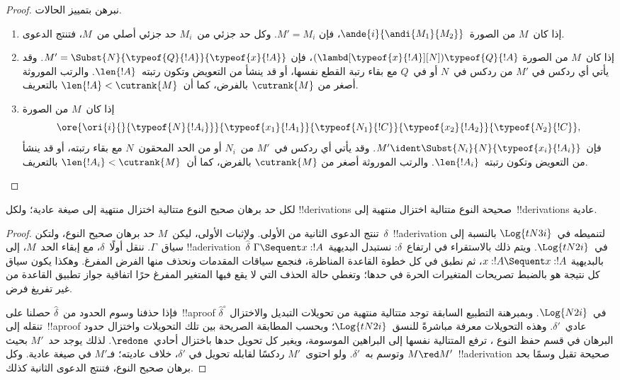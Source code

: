 \documentclass[../../../include/open-logic-section]{subfiles}
\begin{document}
\begin{proof}
  نبرهن بتمييز الحالات.
  \begin{enumerate}
  \item إذا كان~$M$ من الصورة~$\ande{i}{\andi{M_1}{M_2}}$، فإن
    $M'=M_i$. وكل حد جزئي من~$M_i$ حد جزئي أصلي من~$M$، فتنتج الدعوى.
  \item إذا كان~$M$ من الصورة
    $(\lambd[\typeof{x}{!A}][N])\typeof{Q}{!A}$، فإن
    $M'=\Subst{N}{\typeof{Q}{!A}}{\typeof{x}{!A}}$. وقد يأتي أي ردكس في
    $M'$ من ردكس في~$N$ أو في~$Q$ مع بقاء رتبة القطع نفسها، أو قد ينشأ من
    التعويض وتكون رتبته~$\len{!A}$. والرتب الموروثة أصغر من
    $\cutrank{M}$ بالفرض، كما أن~$\len{!A}<\cutrank{M}$ بالتعريف.
  \item إذا كان~$M$ من الصورة
    \[
    \ore{\ori{i}{}{\typeof{N}{!A_i}}}
        {\typeof{x_1}{!A_1}}{\typeof{N_1}{!C}}
        {\typeof{x_2}{!A_2}}{\typeof{N_2}{!C}},
    \]
    فإن~$M'\ident\Subst{N_i}{N}{\typeof{x_i}{!A_i}}$. وقد يأتي أي ردكس
    في~$M'$ من~$N_i$ أو من الحد المحقون~$N$ مع بقاء رتبته، أو قد ينشأ من
    التعويض وتكون رتبته~$\len{!A_i}$. والرتب الموروثة أصغر من
    $\cutrank{M}$ بالفرض، كما أن~$\len{!A_i}<\cutrank{M}$ بالتعريف.
  \end{enumerate}
\end{proof}

\begin{thm}
  لكل حد برهان صحيح النوع متتالية اختزال منتهية إلى صيغة عادية؛ ولكل
  !!{derivation}s صحيحة النوع متتالية اختزال منتهية إلى~!!{derivation}s
  عادية.
\end{thm}

\begin{proof}
  تنتج الدعوى الثانية من الأولى. ولإثبات الأولى، ليكن~$M$ حد برهان صحيح
  النوع، ولتكن~$\delta$~!!a{derivation} لتنميطه في~$\Log{tN3i}$ بالنسبة
  إلى سياق~$\Gamma$. ننقل أولًا~$\delta$، مع إبقاء الحد~$M$، إلى
  !!a{derivation}~$\widehat\delta$ في~$\Log{tN2i}$. ويتم ذلك بالاستقراء في
  ارتفاع~$\delta$: نستبدل البديهية~$\Gamma\Sequent x:!A$ بالبديهية
  $x:!A\Sequent x:!A$، ثم نطبق في كل خطوة القاعدة المناظرة، فنجمع سياقات
  المقدمات ونحذف منها الفرض المفرغ. وهكذا يكون سياق كل نتيجة هو بالضبط
  تصريحات المتغيرات الحرة في حدها؛ وتغطي حالة الحذف التي لا يقع فيها
  المتغير المفرغ حرًا اتفاقية جواز تطبيق القاعدة من غير تفريغ فرض.

  فإذا حذفنا وسوم الحدود من~$\widehat\delta$ حصلنا على~!!a{proof}
  $\widehat\delta^\circ$ في~$\Log{N2i}$. وبمبرهنة التطبيع السابقة
   توجد متتالية منتهية من
  تحويلات التبديل والاختزال تنقله إلى~!!a{proof} عادي~$\delta'$. وهذه
  التحويلات معرفة مباشرةً للنسق~$\Log{tN2i}$؛ وبحسب المطابقة الصريحة بين
  تلك التحويلات واختزال حدود البرهان في قسم حفظ النوع
  ، ترفع المتتالية نفسها إلى البراهين الموسومة،
  ويغير كل تحويل حدها باختزال أحادي~$\redone$. لذلك يوجد حد~$M'$ بحيث
  $M\red M'$ وتوسم به~$\delta'$. ولو احتوى~$M'$ ردكسًا لقابله تحويل في
  $\delta'$، خلاف عاديته؛ فـ$M'$ في صيغة عادية. وكل~!!a{derivation} صحيحة
  تقبل وسمًا بحد برهان صحيح النوع، فتنتج الدعوى الثانية كذلك.
\end{proof}
\end{document}
